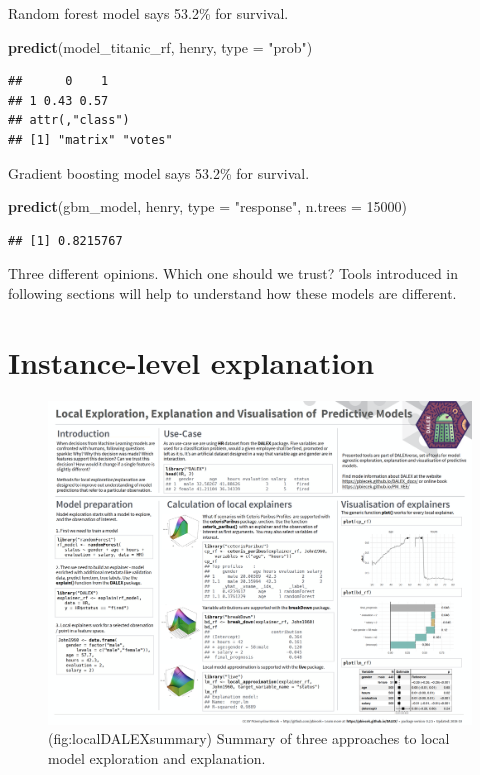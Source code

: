 \documentclass[]{krantz}
\newenvironment{Shaded}{\begin{snugshade}}{\end{snugshade}}
\newcommand{\DataTypeTok}[1]{\textcolor[rgb]{0.13,0.29,0.53}{#1}}
\newcommand{\DecValTok}[1]{\textcolor[rgb]{0.00,0.00,0.81}{#1}}
\newcommand{\KeywordTok}[1]{\textcolor[rgb]{0.13,0.29,0.53}{\textbf{#1}}}
\newcommand{\NormalTok}[1]{#1}
\newcommand{\StringTok}[1]{\textcolor[rgb]{0.31,0.60,0.02}{#1}}
\theoremstyle{definition}
\theoremstyle{definition}
\theoremstyle{definition}
\theoremstyle{remark}
\begin{document}
Random forest model says 53.2\% for survival.

\begin{Shaded}
\begin{Highlighting}[]
\KeywordTok{predict}\NormalTok{(model_titanic_rf, henry, }\DataTypeTok{type =} \StringTok{"prob"}\NormalTok{)}
\end{Highlighting}
\end{Shaded}

\begin{verbatim}
##      0    1
## 1 0.43 0.57
## attr(,"class")
## [1] "matrix" "votes"
\end{verbatim}

Gradient boosting model says 53.2\% for survival.

\begin{Shaded}
\begin{Highlighting}[]
\KeywordTok{predict}\NormalTok{(gbm_model, henry, }\DataTypeTok{type =} \StringTok{"response"}\NormalTok{, }\DataTypeTok{n.trees =} \DecValTok{15000}\NormalTok{)}
\end{Highlighting}
\end{Shaded}

\begin{verbatim}
## [1] 0.8215767
\end{verbatim}

Three different opinions. Which one should we trust? Tools introduced in
following sections will help to understand how these models are
different.

\hypertarget{instance-level-explanation}{%
\section*{Instance-level explanation}\label{instance-level-explanation}}

\begin{figure}

{\centering \includegraphics[width=0.99\linewidth]{figure/DALEX_local} 

}

\caption{(fig:localDALEXsummary) Summary of three approaches to local model exploration and explanation.}\label{fig:localDALEXsummary}
\end{figure}
\end{document}
